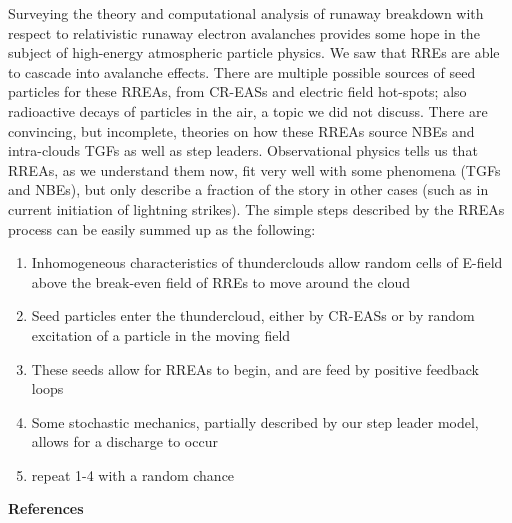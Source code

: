 \documentclass[11pt]{article}
\begin{document}
    Surveying the theory and computational analysis of runaway breakdown with respect to relativistic runaway electron avalanches provides some hope in the subject of high-energy atmospheric particle physics. We saw that RREs are able to cascade into avalanche effects. There are multiple possible sources of seed particles for these RREAs, from CR-EASs and electric field hot-spots; also radioactive decays of particles in the air, a topic we did not discuss. There are convincing, but incomplete, theories on how these RREAs source NBEs and intra-clouds TGFs as well as step leaders. Observational physics tells us that RREAs, as we understand them now, fit very well with some phenomena (TGFs and NBEs), but only describe a fraction of the story in other cases (such as in current initiation of lightning strikes). The simple steps described by the RREAs process can be easily summed up as the following:
    \begin{enumerate}
        \item Inhomogeneous characteristics of thunderclouds allow random cells of E-field above the break-even field of RREs to move around the cloud
        \item Seed particles enter the thundercloud, either by CR-EASs or by random excitation of a particle in the moving field
        \item These seeds allow for RREAs to begin, and are feed by positive feedback loops
        \item Some stochastic mechanics, partially described by our step leader model, allows for a discharge to occur
        \item repeat 1-4 with a random chance
    \end{enumerate}
    





    \newpage
    \noindent
{\bf \LARGE References}\\
\setlength{\parskip}{0em}
\end{document}
